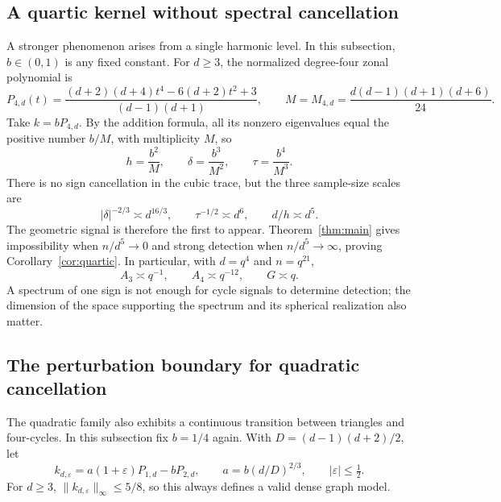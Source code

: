 \documentclass[11pt,reqno]{amsart}
\numberwithin{equation}{section}
\theoremstyle{definition}
\theoremstyle{remark}
\theoremstyle{definition}
\begin{document}
\subsection{A quartic kernel without spectral cancellation}
A stronger phenomenon arises from a single harmonic level. In this subsection, $b\in(0,1)$ is any fixed constant.
For $d\ge3$, the normalized degree-four zonal polynomial is
\[
 P_{4,d}(t)=\frac{(d+2)(d+4)t^4-6(d+2)t^2+3}{(d-1)(d+1)},
 \qquad M=M_{4,d}=\frac{d(d-1)(d+1)(d+6)}{24}.
\]
Take $k=bP_{4,d}$. By the addition formula, all its nonzero eigenvalues equal the positive number $b/M$,
with multiplicity $M$, so
\begin{equation}\label{eq:quartic-traces}
 h=\frac{b^2}{M},\qquad \delta=\frac{b^3}{M^2},\qquad
 \tau=\frac{b^4}{M^3}.
\end{equation}
There is no sign cancellation in the cubic trace, but the three sample-size scales are
\[
 |\delta|^{-2/3}\asymp d^{16/3},\qquad
 \tau^{-1/2}\asymp d^6,\qquad d/h\asymp d^5.
\]
The geometric signal is therefore the first to appear.
Theorem~\ref{thm:main} gives impossibility when $n/d^5\to0$
and strong detection when $n/d^5\to\infty$, proving Corollary~\ref{cor:quartic}.
In particular, with $d=q^4$ and $n=q^{21}$,
\begin{equation}\label{eq:quartic-gap}
 A_3\asymp q^{-1},\qquad A_4\asymp q^{-12},\qquad G\asymp q.
\end{equation}
A spectrum of one sign is not enough for cycle signals to determine detection;
the dimension of the space supporting the spectrum and its spherical realization also matter.

\subsection{The perturbation boundary for quadratic cancellation}
The quadratic family also exhibits a continuous transition between triangles and four-cycles.
In this subsection fix $b=1/4$ again. With $D=(d-1)(d+2)/2$, let
\begin{equation}\label{eq:perturbed-kernel}
 k_{d,\varepsilon}=a(1+\varepsilon)P_{1,d}-bP_{2,d},\qquad
 a=b(d/D)^{2/3},\qquad |\varepsilon|\le\tfrac12.
\end{equation}
For $d\ge3$, $\|k_{d,\varepsilon}\|_\infty\le5/8$, so this always defines a valid dense graph model.
\end{document}
